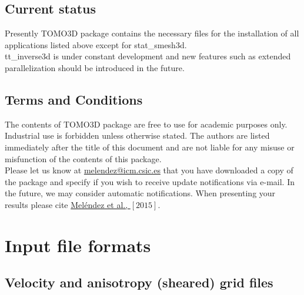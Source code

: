 \documentclass[twoside,final,onecolumn]{article}
\begin{document}
\subsection{Current status}
Presently TOMO3D package contains the necessary files for the installation of all applications listed above except for stat\_smesh3d.\\
\newline
tt\_inverse3d is under constant development and new features such as extended parallelization should be introduced in the future.

\subsection{Terms and Conditions}
The contents of TOMO3D package are free to use for academic purposes only. Industrial use is forbidden unless otherwise stated.
The authors are listed immediately after the title of this document and are not liable for any misuse or misfunction of the contents of this package.\\
\newline
Please let us know at \href{mailto:melendez@icm.csic.es}{melendez@icm.csic.es} that you have downloaded a copy of the package and specify if you wish
to receive update notifications via e-mail. In the future, we may consider automatic notifications.
When presenting your results please cite \href{http://www.dx.doi.org/10.1093/gji/ggv292}{Mel\'{e}ndez et al., $[2015]$}.

\section{Input file formats}
 
\subsection{Velocity and anisotropy (sheared) grid files}
\end{document}

